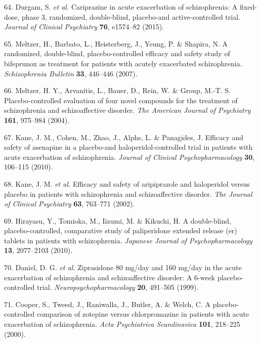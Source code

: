 \documentclass[9pt,english,,jou,floatsintext]{apa6}
\begin{document}
\hypertarget{ref-Durgam2015}{}
64. Durgam, S. \emph{et al.} Cariprazine in acute exacerbation of
schizophrenia: A fixed-dose, phase 3, randomized, double-blind,
placebo-and active-controlled trial. \emph{Journal of Clinical
Psychiatry} \textbf{76}, e1574--82 (2015).

\hypertarget{ref-Meltzer2007}{}
65. Meltzer, H., Barbato, L., Heisterberg, J., Yeung, P. \& Shapira, N.
A randomized, double-blind, placebo-controlled efficacy and safety study
of bifeprunox as treatment for patients with acutely exacerbated
schizophrenia. \emph{Schizophrenia Bulletin} \textbf{33}, 446--446
(2007).

\hypertarget{ref-Meltzer2004}{}
66. Meltzer, H. Y., Arvanitis, L., Bauer, D., Rein, W. \& Group, M.-T.
S. Placebo-controlled evaluation of four novel compounds for the
treatment of schizophrenia and schizoaffective disorder. \emph{The
American Journal of Psychiatry} \textbf{161}, 975--984 (2004).

\hypertarget{ref-Kane2010}{}
67. Kane, J. M., Cohen, M., Zhao, J., Alphs, L. \& Panagides, J.
Efficacy and safety of asenapine in a placebo-and haloperidol-controlled
trial in patients with acute exacerbation of schizophrenia.
\emph{Journal of Clinical Psychopharmacology} \textbf{30}, 106--115
(2010).

\hypertarget{ref-Kane2002}{}
68. Kane, J. M. \emph{et al.} Efficacy and safety of aripiprazole and
haloperidol versus placebo in patients with schizophrenia and
schizoaffective disorder. \emph{The Journal of Clinical Psychiatry}
\textbf{63}, 763--771 (2002).

\hypertarget{ref-Hirayasu2010}{}
69. Hirayasu, Y., Tomioka, M., Iizumi, M. \& Kikuchi, H. A double-blind,
placebo-controlled, comparative study of paliperidone extended release
(er) tablets in patients with schizophrenia. \emph{Japanese Journal of
Psychopharmacology} \textbf{13}, 2077--2103 (2010).

\hypertarget{ref-Daniel1999}{}
70. Daniel, D. G. \emph{et al.} Ziprasidone 80 mg/day and 160 mg/day in
the acute exacerbation of schizophrenia and schizoaffective disorder: A
6-week placebo-controlled trial. \emph{Neuropsychopharmacology}
\textbf{20}, 491--505 (1999).

\hypertarget{ref-Cooper2000}{}
71. Cooper, S., Tweed, J., Raniwalla, J., Butler, A. \& Welch, C. A
placebo-controlled comparison of zotepine versus chlorpromazine in
patients with acute exacerbation of schizophrenia. \emph{Acta
Psychiatrica Scandinavica} \textbf{101}, 218--225 (2000).
\end{document}
